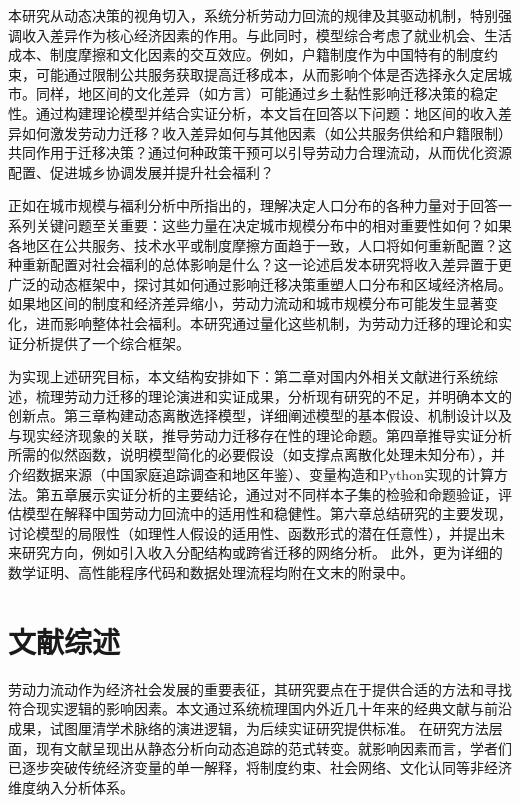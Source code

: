 \documentclass[
  a4paper,
  zihao=-4,
  fontset=mac,
  AutoFakeBold,
  AutoFakeSlant,
  oneside]{ctexbook}
\begin{document}
本研究从动态决策的视角切入，系统分析劳动力回流的规律及其驱动机制，特别强调收入差异作为核心经济因素的作用。与此同时，模型综合考虑了就业机会、生活成本、制度摩擦和文化因素的交互效应。例如，户籍制度作为中国特有的制度约束，可能通过限制公共服务获取提高迁移成本，从而影响个体是否选择永久定居城市。同样，地区间的文化差异（如方言）可能通过乡土黏性影响迁移决策的稳定性。通过构建理论模型并结合实证分析，本文旨在回答以下问题：地区间的收入差异如何激发劳动力迁移？收入差异如何与其他因素（如公共服务供给和户籍限制）共同作用于迁移决策？通过何种政策干预可以引导劳动力合理流动，从而优化资源配置、促进城乡协调发展并提升社会福利？

正如\textcite{desmetUrbanAccountingWelfare2013}在城市规模与福利分析中所指出的，理解决定人口分布的各种力量对于回答一系列关键问题至关重要：这些力量在决定城市规模分布中的相对重要性如何？如果各地区在公共服务、技术水平或制度摩擦方面趋于一致，人口将如何重新配置？这种重新配置对社会福利的总体影响是什么？这一论述启发本研究将收入差异置于更广泛的动态框架中，探讨其如何通过影响迁移决策重塑人口分布和区域经济格局。如果地区间的制度和经济差异缩小，劳动力流动和城市规模分布可能发生显著变化，进而影响整体社会福利。本研究通过量化这些机制，为劳动力迁移的理论和实证分析提供了一个综合框架。

为实现上述研究目标，本文结构安排如下：第二章对国内外相关文献进行系统综述，梳理劳动力迁移的理论演进和实证成果，分析现有研究的不足，并明确本文的创新点。第三章构建动态离散选择模型，详细阐述模型的基本假设、机制设计以及与现实经济现象的关联，推导劳动力迁移存在性的理论命题。第四章推导实证分析所需的似然函数，说明模型简化的必要假设（如支撑点离散化处理未知分布），并介绍数据来源（中国家庭追踪调查和地区年鉴）、变量构造和Python实现的计算方法。第五章展示实证分析的主要结论，通过对不同样本子集的检验和命题验证，评估模型在解释中国劳动力回流中的适用性和稳健性。第六章总结研究的主要发现，讨论模型的局限性（如理性人假设的适用性、函数形式的潜在任意性），并提出未来研究方向，例如引入收入分配结构或跨省迁移的网络分析。
此外，更为详细的数学证明、高性能程序代码和数据处理流程均附在文末的附录中。

\chapter{文献综述}

劳动力流动作为经济社会发展的重要表征，其研究要点在于提供合适的方法和寻找符合现实逻辑的影响因素。本文通过系统梳理国内外近几十年来的经典文献与前沿成果，试图厘清学术脉络的演进逻辑，为后续实证研究提供标准。
在研究方法层面，现有文献呈现出从静态分析向动态追踪的范式转变。就影响因素而言，学者们已逐步突破传统经济变量的单一解释，将制度约束、社会网络、文化认同等非经济维度纳入分析体系。
\end{document}
